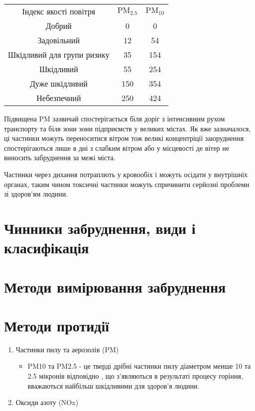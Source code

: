 \begin{center}
    \begin{tabular}{c c c}
        Індекс якості повітря & 
        $\mathrm{PM}_{2.5}$ & $\mathrm{PM}_{10}$ \\
        \cellcolor{green}
        Добрий & 0 & 0\\
        \cellcolor{yellow}
        Задовільний & 12 & 54\\
        \cellcolor{orange}
        Шкідливий для групи ризику & 35 & 154\\
        \cellcolor{red}
        Шкідливий & 55 & 254\\
        \cellcolor{Mahogany}
        Дуже шкідливий & 150 & 354\\
        \cellcolor{Sepia}
        Небезпечний & 250 & 424\\
    \end{tabular}
    
    \vspace{1cm}
\end{center}


Підвищена PM зазвичай спостерігається біля доріг з інтенсивним рухом транспорту та
біля зони зони підприємств у великих містах. Як вже зазначалося, ці частинки можуть 
переноситися вітром тож великі концентріції заюруднення спостерігаються лише в дні з 
слабким вітром або у місцевості де вітер не виносить забруднення за межі міста.

Частинки через дихання потраплють у кровообіх і можуть осідати у внутрішніх органах, 
таким чином токсичні частинки можуть спричинити серйозні проблеми зі здоров'ям людини.


\section{Чинники забруднення, види і класифікація}



\section{Методи вимірювання забруднення}

\section{Методи протидії}


\begin{enumerate}
    \item Частинки пилу та аерозолів (PM)
        \begin{itemize}
            \item PM10 та PM2.5 - це тверді дрібні частинки пилу діаметром менше 10 та 2.5 мікронів відповідно , що з'являються в результаті процесу горіння, 
            вважаються найбільш шкідливими для здоров'я людини. 
        \end{itemize}
    \item Оксиди азоту (NOx)
\end{enumerate}